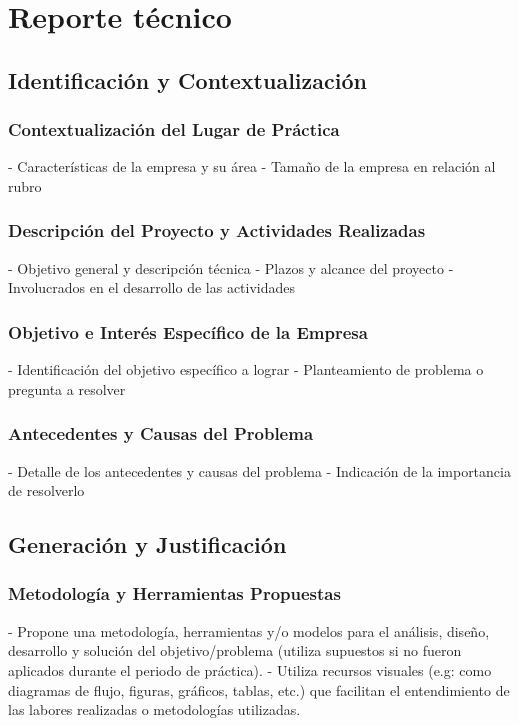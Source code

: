 \section{Reporte técnico}

\subsection{Identificación y Contextualización}

\subsubsection{Contextualización del Lugar de Práctica}
    - Características de la empresa y su área
    - Tamaño de la empresa en relación al rubro

\subsubsection{Descripción del Proyecto y Actividades Realizadas}
    - Objetivo general y descripción técnica
    - Plazos y alcance del proyecto
    - Involucrados en el desarrollo de las actividades

\subsubsection{Objetivo e Interés Específico de la Empresa}
    - Identificación del objetivo específico a lograr
    - Planteamiento de problema o pregunta a resolver

\subsubsection{Antecedentes y Causas del Problema}
    - Detalle de los antecedentes y causas del problema
    - Indicación de la importancia de resolverlo

\subsection{Generación y Justificación}

\subsubsection{Metodología y Herramientas Propuestas}
    - Propone una metodología, herramientas y/o modelos para el análisis, diseño, desarrollo y solución del objetivo/problema (utiliza supuestos si no fueron aplicados durante el periodo de práctica).
    - Utiliza recursos visuales (e.g: como diagramas de flujo, figuras, gráficos, tablas, etc.) que facilitan el entendimiento de las labores realizadas o metodologías utilizadas.

